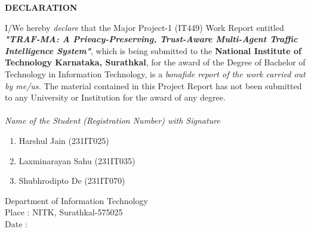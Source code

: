 
\begin{framed}
	\begin{center}
		\textbf{{\Large DECLARATION}}\\
	\end{center}
	\null
	I/We hereby \textit{declare} that the Major Project-1 (IT449) Work Report entitled \textit{\textbf{"TRAF-MA: A Privacy-Preserving, Trust-Aware Multi-Agent Traffic Intelligence System"}},  which is being submitted to the \textbf{National Institute of Technology Karnataka, Surathkal}, for the award of the Degree of Bachelor of Technology in Information Technology, is a \textit{bonafide report of the work carried out by me/us.} The material contained in this Project Report has not been submitted to any University or Institution for the award of any degree.
	\\
	\\
	\textit{Name of the Student (Registration Number) with Signature }
	\begin{enumerate}[label={(\arabic*)}]
		\item  Harshul Jain  (231IT025)
		\item  Laxminarayan Sahu  (231IT035)
		\item  Shubhrodipto De  (231IT070)
	\end{enumerate}
	\null
	Department of Information Technology \\
	Place     : NITK, Surathkal-575025 \\
	Date      :  
	\\
	\\
	\\
	\\
	\\
	\\
	\\
	\\
	\\
	\\
\end{framed}